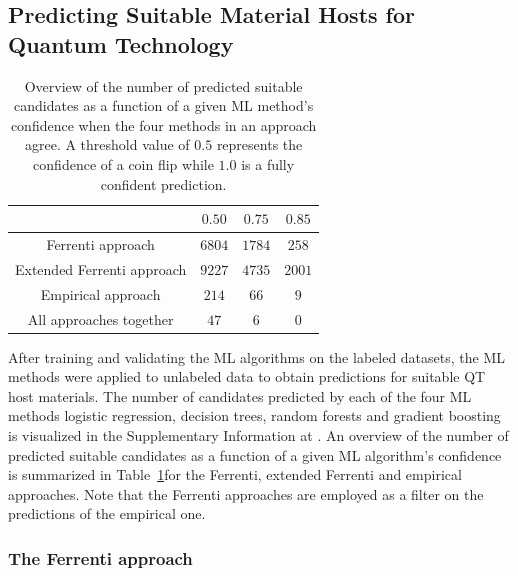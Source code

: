 \documentclass[superscriptaddress,
preprint,
 amsmath,amssymb,
 aps,
]{revtex4-2}
\newcommand{\mrk}[1]{\textcolor{red}{#1}}
\begin{document}
\subsection*{Predicting Suitable Material Hosts for Quantum Technology} 

\begin{table}[b]
    \centering 
    \caption{Overview of the number of predicted suitable candidates as a function of a given ML method's confidence when the four methods in an approach agree. A threshold value of $0.5$ represents the confidence of a coin flip while $1.0$ is a fully confident prediction.}
    \begin{tabular}{c|c|c|c}
      & $0.50$ & $0.75$ & $0.85$ \\
     \hline
     Ferrenti approach &  $6804$ & $1784$ & $258$  \\
     Extended Ferrenti approach &  $9227$ & $4735$  & $2001$  \\ 
     Empirical approach & $214$ & $66$ & $9$ \\
     \hline
     All approaches together & $47$ & $6$ & 0 \\
    \end{tabular}
    \label{tab:probabilites}
\end{table} 


After training and validating the ML algorithms on the labeled datasets, the ML methods were applied to unlabeled data to obtain predictions for suitable QT host materials. 
The number of candidates predicted by each of the four ML methods logistic regression, decision trees, random forests and gradient boosting is visualized in the Supplementary Information at \cite{supplementary}. %
An overview of the number of predicted suitable candidates as a function of a given ML algorithm's confidence is summarized in Table~\ref{tab:probabilites}for the Ferrenti, extended Ferrenti and empirical approaches. Note that the Ferrenti approaches are employed as a filter on the predictions of the empirical one. 

\subsubsection*{The Ferrenti approach}
\end{document}
